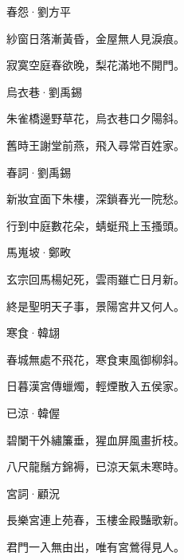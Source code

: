 \documentclass[12pt,a4paper]{ctexbook}
\begin{document}
春怨·劉方平\par
紗窗日落漸黃昏，金屋無人見淚痕。\par
寂寞空庭春欲晚，梨花滿地不開門。\par
烏衣巷·劉禹錫\par
朱雀橋邊野草花，烏衣巷口夕陽斜。\par
舊時王謝堂前燕，飛入尋常百姓家。\par
春詞·劉禹錫\par
新妝宜面下朱樓，深鎖春光一院愁。\par
行到中庭數花朵，蜻蜓飛上玉搔頭。\par
馬嵬坡·鄭畋\par
玄宗回馬楊妃死，雲雨雖亡日月新。\par
終是聖明天子事，景陽宮井又何人。\par
寒食·韓翃\par
春城無處不飛花，寒食東風御柳斜。\par
日暮漢宮傳蠟燭，輕煙散入五侯家。\par
已涼·韓偓\par
碧闌干外繡簾垂，猩血屏風畫折枝。\par
八尺龍鬚方錦褥，已涼天氣未寒時。\par
宮詞·顧況\par
長樂宮連上苑春，玉樓金殿豔歌新。\par
君門一入無由出，唯有宮鶯得見人。\par
\end{document}
